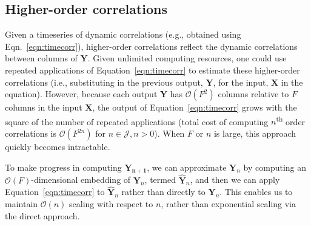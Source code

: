 \documentclass[english]{article}
\begin{document}
\subsection*{Higher-order correlations}
Given a timeseries of dynamic correlations (e.g., obtained using
Eqn.~\ref{eqn:timecorr}), higher-order correlations reflect the
dynamic correlations between columns of $\mathbf{Y}$.  Given unlimited
computing resources, one could use repeated applications of
Equation~\ref{eqn:timecorr} to estimate these higher-order
correlations (i.e., substituting in the previous output, $\mathbf{Y}$,
for the input, $\mathbf{X}$ in the equation).  However, because each
output $\mathbf{Y}$ has $\mathcal{O}(F^2)$ columns relative to $F$ columns in
the input $\mathbf{X}$, the output of Equation~\ref{eqn:timecorr}
grows with the square of the number of repeated applications (total
cost of computing $n$\textsuperscript{th} order correlations is
$\mathcal{O}(F^{2n})$ for $n \in \mathcal{J}, n > 0$).  When $F$ or $n$ is large,
this approach quickly becomes intractable.

To make progress in computing $\mathbf{Y_{n+1}}$, we can approximate
$\mathbf{Y}_n$ by computing an $\mathcal{O}(F)$-dimensional embedding of
$\mathbf{Y}_n$, termed $\hat{\mathbf{Y}}_n$, and then we can apply
Equation~\ref{eqn:timecorr} to $\hat{\mathbf{Y}}_n$ rather than
directly to $\mathbf{Y}_n$.  This enables us to maintain $\mathcal{O}(n)$
scaling with respect to $n$, rather than exponential scaling via the
direct approach.
\end{document}
